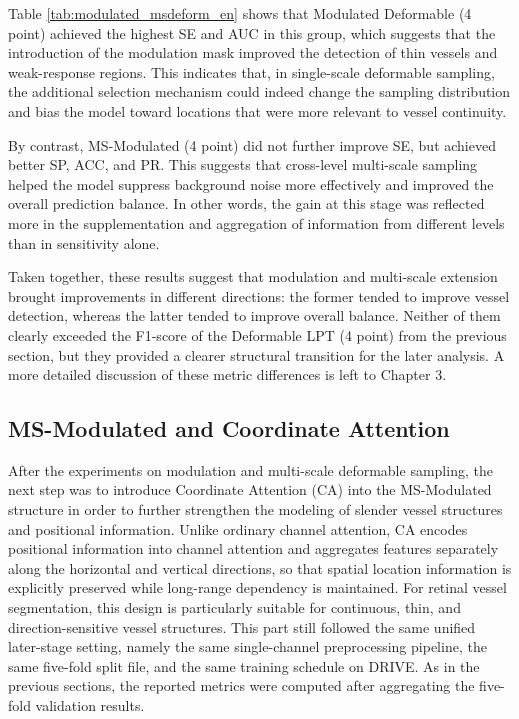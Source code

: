 \documentclass[a4paper,12pt]{article}
\begin{document}
Table \ref{tab:modulated_msdeform_en} shows that Modulated Deformable (4 point) achieved the highest SE and AUC in this group, which suggests that the introduction of the modulation mask improved the detection of thin vessels and weak-response regions. This indicates that, in single-scale deformable sampling, the additional selection mechanism could indeed change the sampling distribution and bias the model toward locations that were more relevant to vessel continuity.

By contrast, MS-Modulated (4 point) did not further improve SE, but achieved better SP, ACC, and PR. This suggests that cross-level multi-scale sampling helped the model suppress background noise more effectively and improved the overall prediction balance. In other words, the gain at this stage was reflected more in the supplementation and aggregation of information from different levels than in sensitivity alone.

Taken together, these results suggest that modulation and multi-scale extension brought improvements in different directions: the former tended to improve vessel detection, whereas the latter tended to improve overall balance. Neither of them clearly exceeded the F1-score of the Deformable LPT (4 point) from the previous section, but they provided a clearer structural transition for the later analysis. A more detailed discussion of these metric differences is left to Chapter 3.

\subsection{MS-Modulated and Coordinate Attention}

After the experiments on modulation and multi-scale deformable sampling, the next step was to introduce Coordinate Attention (CA) \cite{hou2021coordatt} into the MS-Modulated structure in order to further strengthen the modeling of slender vessel structures and positional information. Unlike ordinary channel attention, CA encodes positional information into channel attention and aggregates features separately along the horizontal and vertical directions, so that spatial location information is explicitly preserved while long-range dependency is maintained. For retinal vessel segmentation, this design is particularly suitable for continuous, thin, and direction-sensitive vessel structures. This part still followed the same unified later-stage setting, namely the same single-channel preprocessing pipeline, the same five-fold split file, and the same training schedule on DRIVE. As in the previous sections, the reported metrics were computed after aggregating the five-fold validation results.
\end{document}
